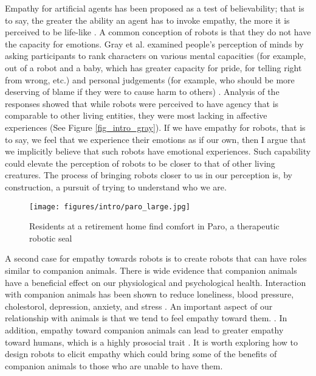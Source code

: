Empathy for artificial agents has been proposed as a test of believability; that is to say, the greater the ability an agent has to invoke empathy, the more it is perceived  to be life-like \cite{paiva_empathic_virtual_agents}. A common conception of robots is that they do not have the capacity for emotions. Gray et al. examined people's perception of minds by asking participants to rank characters on various mental capacities (for example, out of a robot and a baby, which has greater capacity for pride, for telling right from wrong, etc.) and personal judgements (for example, who should be more deserving of blame if they were to cause harm to others) \cite{gray_dimensions_mind}.  Analysis of the responses showed that while robots were perceived to have agency that is comparable to other living entities, they were most lacking in affective experiences (See Figure \ref{fig_intro_gray}).  If we have empathy for robots, that is to say, we feel that we experience their emotions as if our own, then I argue that we implicitly believe that such robots have emotional experiences. Such capability could elevate the perception of robots to be closer to that of other living creatures. The process of bringing robots closer to us in our perception is, by construction, a pursuit of trying to understand who we are. 



   \begin{figure}[thpb]
      \centering
      \texttt{[image: figures/intro/paro\_large.jpg]}
      \caption{Residents at a retirement home find comfort in Paro, a therapeutic robotic seal\cite{nbcnews_paro}}
      \label{fig_intro_paro}
   \end{figure}
   

    A second case for empathy towards robots is to create robots that can have roles similar to companion animals. There is wide evidence that companion animals have a beneficial effect on our physiological and psychological health. Interaction with companion animals has been shown to reduce loneliness, blood pressure, cholestorol, depression, anxiety, and stress \cite{walsh_human_animal_bond}. An important aspect of our relationship with animals is that we tend to feel empathy toward them. \cite{phillips_empathy_animals}. In addition, empathy toward companion animals can lead to greater empathy toward humans, which is a highly prosocial trait \cite{gullone_empathy_prosocial_pets}. It is worth exploring how to design robots to elicit empathy which could bring some of the benefits of companion animals to those who are unable to have them.


